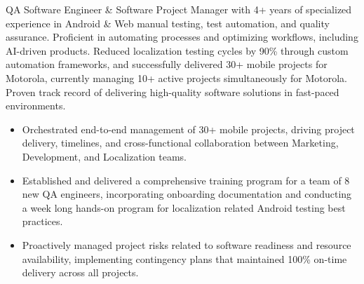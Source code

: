 \documentclass[10pt,a4paper,ragged2e]{altacv}
\begin{document}

    \begin{fullwidth}
      \makecvheader
    \end{fullwidth}


    QA Software Engineer \& Software Project Manager with 4+ years of specialized experience in Android \& Web manual testing, test automation, and quality assurance. Proficient in automating processes and optimizing workflows, including AI-driven products. Reduced localization testing cycles by 90\% through custom automation frameworks, and successfully delivered 30+ mobile projects for Motorola, currently managing 10+ active projects simultaneously for Motorola. Proven track record of delivering high-quality software solutions in fast-paced environments.



    \begin{itemize}
      \item Orchestrated end-to-end management of 30+ mobile projects, driving project delivery, timelines, and cross-functional collaboration between Marketing, Development, and Localization teams.
      \item Established and delivered a comprehensive training program for a team of 8 new QA engineers, incorporating onboarding documentation and conducting a week long hands-on program for localization related Android testing best practices.
      \item Proactively managed project risks related to software readiness and resource availability, implementing contingency plans that maintained 100\% on-time delivery across all projects.
    \end{itemize}
\end{document}
